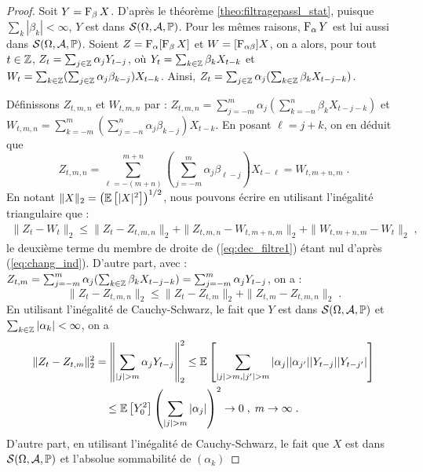  \begin{proof}\smartqed
 Soit $Y=\operatorname{F}_{\beta}X$. D'apr\`es le th\'eor\`eme \ref{theo:filtragepassl_stat},
puisque $\sum_k|\beta_k|<\infty$, $Y$ est dans $\mathcal{S}(\Omega,\mathcal{A},\mathbb{P})$.
Pour les m\^{e}mes raisons, $\operatorname{F}_{\alpha}Y$ est lui aussi dans $\mathcal{S}(\Omega,\mathcal{A},\mathbb{P})$.
Soient $Z=\operatorname{F}_{\alpha}[\operatorname{F}_{\beta}X]$ et $W=[\operatorname{F}_{\alpha\beta}]X$, on a alors, pour tout $t\in\mathbb{Z}$,
$Z_t=\sum_{j\in\mathbb{Z}}\alpha_j Y_{t-j}$,
o\`u $Y_t=\sum_{k\in\mathbb{Z}}\beta_k X_{t-k}$ et $W_t=\sum_{k\in\mathbb{Z}}(\sum_{j\in\mathbb{Z}}\alpha_j\beta_{k-j})X_{t-k}$. Ainsi,
$Z_t=\sum_{j\in\mathbb{Z}}\alpha_j(\sum_{k\in\mathbb{Z}}\beta_k X_{t-j-k})$.

D\'efinissons $Z_{t,m,n}$ et $W_{t,m,n}$ par :
$Z_{t,m,n}=\sum_{j=-m}^m\alpha_j(\sum_{k=-n}^n\beta_k X_{t-j-k})$
et $W_{t,m,n}=\sum_{k=-m}^m(\sum_{j=-n}^n\alpha_j\beta_{k-j})X_{t-k}$.
En posant $\ell=j+k$, on en d\'eduit que
\begin{equation}\label{eq:chang_ind}
Z_{t,m,n}=\sum_{\ell=-(m+n)}^{m+n}(\sum_{j=-m}^m\alpha_j\beta_{\ell-j})X_{t-\ell}
=W_{t,m+n,m}\;.
\end{equation}
En notant $\| X \|_2 = \left( {\mathbb E}\left[ |X|^2 \right] \right)^{1/2}$, nous pouvons
\'ecrire en utilisant l'in\'egalit\'e triangulaire que :
\begin{multline}\label{eq:dec_filtre1}
\|Z_t-W_t\|_2\leq \|Z_t-Z_{t,m,n}\|_2+\|Z_{t,m,n}-W_{t,m+n,m}\|_2
+\|W_{t,m+n,m}-W_t\|_2\;,
\end{multline}
le deuxi\`eme terme du membre de droite de (\ref{eq:dec_filtre1}) \'etant
nul d'apr\`es (\ref{eq:chang_ind}).
D'autre part, avec :
$Z_{t,m}=\sum_{j=-m}^m\alpha_j(\sum_{k\in\mathbb{Z}}\beta_k X_{t-j-k})
=\sum_{j=-m}^m\alpha_j Y_{t-j}$, on a :
\begin{equation}\label{eq:dec_filtre2}
\|Z_t-Z_{t,m,n}\|_2\leq\|Z_t-Z_{t,m}\|_2+\|Z_{t,m}-Z_{t,m,n}\|_2\;.
\end{equation}
En utilisant l'in\'egalit\'e de Cauchy-Schwarz, le fait que
$Y$ est dans $\mathcal{S}(\Omega,\mathcal{A},\mathbb{P})$ et $\sum_{k\in\mathbb{Z}}|\alpha_k|<\infty$,  on a
\begin{multline}\label{eq:dec_filtre3}
\|Z_t-Z_{t,m}\|_2^2=\left\|\sum_{|j|>m}\alpha_j Y_{t-j}\right\|_2^2
\leq\PE{\sum_{|j|>m,|j'|>m}|\alpha_j| |\alpha_{j'}| |Y_{t-j}| |Y_{t-j'}|}\\
\leq \PE{Y_0^2}\left(\sum_{|j|>m} |\alpha_j|\right)^2\to 0\;,\; m\to\infty\;.
\end{multline}
D'autre part, en utilisant l'in\'egalit\'e de Cauchy-Schwarz, le fait que
$X$ est dans $\mathcal{S}(\Omega,\mathcal{A},\mathbb{P})$ et l'absolue sommabilit\'e de $(\alpha_k)$

\end{proof}
